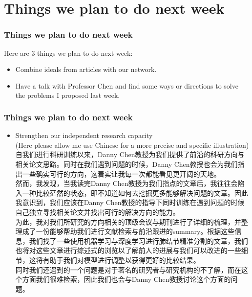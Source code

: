 \documentclass[8pt]{beamer}
\begin{document}
\section*{Things we plan to do next week}	
\begin{frame}[fragile]
\frametitle{ Things we plan to do next week}
Here are 3 things we plan to do next week: 
	\vspace{.3cm}
\begin{itemize}
	\item Combine ideals from articles with our network.\\
	\vspace{.3cm}
	\item Have a talk with Professor Chen and find some ways or directions to solve the problems I proposed last week.
	\vspace{.3cm}

\end{itemize}
\end{frame}
\begin{frame}[fragile]
\frametitle{ Things we plan to do next week}
\begin{itemize}
	\item Strengthen our independent research capacity\\
	(Here please allow me use Chinese for a more precise and specific illustration)\\
	\vspace{.3cm}
	自我们进行科研训练以来，Danny Chen教授为我们提供了前沿的科研方向与相关论文思路。同时在我们遇到问题的时候，Danny Chen教授也会为我们指出一些确实可行的方向，这着实让我每一次都能看见更开阔的天地。\\
	\vspace{.2cm}
	然而，我发现，当我读完Danny Chen教授为我们指点的文章后，我往往会陷入一种比较茫然的状态，即不知道如何去挖掘更多能够解决问题的文章。因此我意识到，我们应该在Danny Chen教授的指导下同时训练在遇到问题的时候自己独立寻找相关论文并找出可行的解决方向的能力。\\
	\vspace{.2cm}
	为此，我对我们所研究的方向相关的顶级会议与期刊进行了详细的梳理，并整理成了一份能够帮助我们进行文献检索与前沿跟进的summary。根据这些信息，我们找了一些使用机器学习与深度学习进行肺结节精准分割的文章，我们也将对这些文章进行综述式的浏览以了解前人的进展与我们可以改进的一些细节，这将有助于我们对模型进行调整以获得更好的比较结果。\\
	\vspace{.2cm}
	同时我们还遇到的一个问题是对于著名的研究者与研究机构的不了解，而在这个方面我们很难检索，因此我们也会与Danny Chen教授讨论这个方面的问题。
	
\end{itemize}
\end{frame}



\end{document}

